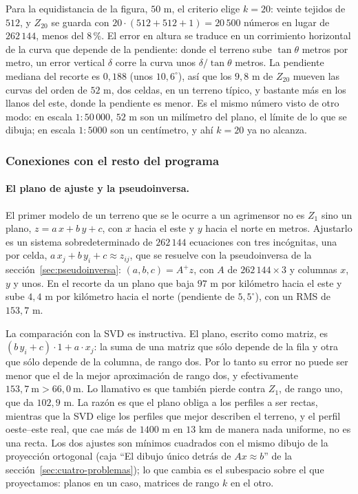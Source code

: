 Para la equidistancia de la figura, \(50\) m, el criterio elige \(k=20\): veinte tejidos de
\(512\), y \(Z_{20}\) se guarda con \(20\cdot(512+512+1)=20\,500\) números en lugar de
\(262\,144\), menos del \(8\)\,\%. El error en altura se traduce en un corrimiento horizontal
de la curva que depende de la pendiente: donde el terreno sube \(\tan\theta\) metros por
metro, un error vertical \(\delta\) corre la curva unos \(\delta/\tan\theta\) metros. La
pendiente mediana del recorte es \(0{,}188\) (unos \(10{,}6^\circ\)), así que los \(9{,}8\) m
de \(Z_{20}\) mueven las curvas del orden de \(52\) m, dos celdas, en un terreno típico, y
bastante más en los llanos del este, donde la pendiente es menor. Es el mismo número visto de
otro modo: en escala \(1\!:\!50\,000\), \(52\) m son un milímetro del plano, el límite de lo
que se dibuja; en escala \(1\!:\!5000\) son un centímetro, y ahí \(k=20\) ya no alcanza.

\subsubsection{Conexiones con el resto del programa}\label{sec:svd-dem-conexiones}

\paragraph{El plano de ajuste y la pseudoinversa.} El primer modelo de un terreno que se le
ocurre a un agrimensor no es \(Z_1\) sino un plano, \(z=a\,x+b\,y+c\), con \(x\) hacia el este
y \(y\) hacia el norte en metros. Ajustarlo es un sistema sobredeterminado de \(262\,144\)
ecuaciones con tres incógnitas, una por celda, \(a\,x_j+b\,y_i+c\approx z_{ij}\), que se
resuelve con la pseudoinversa de la sección~\ref{sec:pseudoinversa}: \((a,b,c)=A^{+}z\), con
\(A\) de \(262\,144\times3\) y columnas \(x\), \(y\) y unos. En el recorte da un plano que baja
\(97\) m por kilómetro hacia el este y sube \(4{,}4\) m por kilómetro hacia el norte
(pendiente de \(5{,}5^\circ\)), con un RMS de \(153{,}7\) m.

La comparación con la SVD es instructiva. El plano, escrito como matriz, es
\((b\,y_i+c)\cdot1+a\cdot x_j\): la suma de una matriz que sólo depende de la fila y otra que
sólo depende de la columna, de rango dos. Por lo tanto su error no puede ser menor que el de la
mejor aproximación de rango dos, y efectivamente \(153{,}7\ \text{m}>66{,}0\ \text{m}\). Lo
llamativo es que también pierde contra \(Z_1\), de rango uno, que da \(102{,}9\) m. La razón
es que el plano obliga a los perfiles a ser rectas, mientras que la SVD elige los perfiles que
mejor describen el terreno, y el perfil oeste--este real, que cae más de \(1400\) m en
\(13\) km de manera nada uniforme, no es una recta. Los dos ajustes son mínimos cuadrados con
el mismo dibujo de la proyección ortogonal (caja ``El dibujo único detrás de \(Ax\approx b\)''
de la sección~\ref{sec:cuatro-problemas}); lo que cambia es el subespacio sobre el que
proyectamos: planos en un caso, matrices de rango \(k\) en el otro.

